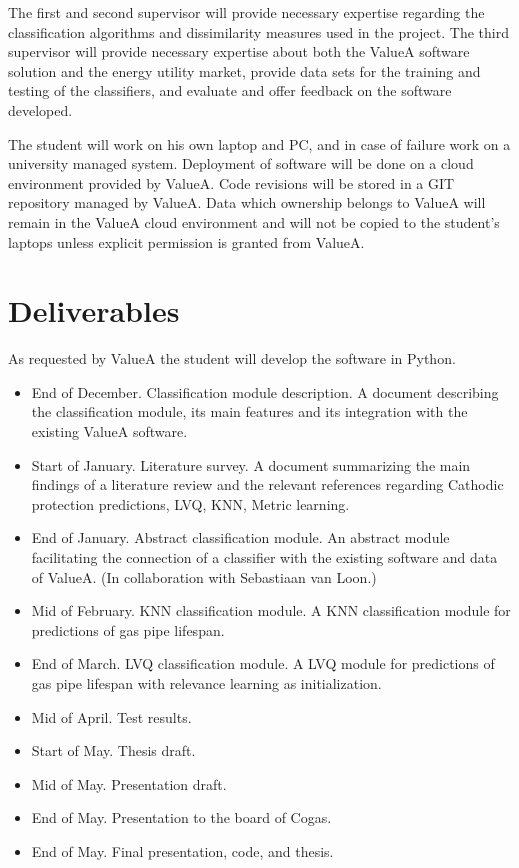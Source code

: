 The first and second supervisor will provide necessary expertise regarding the classification algorithms and dissimilarity measures used in the project. The third supervisor will provide necessary expertise about both the ValueA software solution and the energy utility market, provide data sets for the training and testing of the classifiers, and evaluate and offer feedback on the software developed.

The student will work on his own laptop and PC, and in case of failure work on a university managed system.  Deployment of software will be done on a cloud environment provided by ValueA. Code revisions will be stored in a GIT repository managed by ValueA. Data which ownership belongs to ValueA will remain in the ValueA cloud environment and will not be copied to the student’s laptops unless explicit permission is granted from ValueA.

\section{Deliverables}

As requested by ValueA the student will develop the software in Python.
\begin{itemize}
\item End of December. Classification module description. A document describing the classification module, its main features and its integration with the existing ValueA software.
\item Start of January. Literature survey. A document summarizing the main findings of a literature review and the relevant references regarding Cathodic protection predictions, LVQ, KNN, Metric learning.
\item End of January. Abstract classification module. An abstract module facilitating the connection of a classifier with the existing software and data of ValueA. (In collaboration with Sebastiaan van Loon.)
\item Mid of February. KNN classification module. A KNN classification module for predictions of gas pipe lifespan.
\item End of March. LVQ classification module. A LVQ module for predictions of gas pipe lifespan with relevance learning as initialization.
\item Mid of April. Test results.
\item Start of May. Thesis draft.
\item Mid of May. Presentation draft.
\item End of May. Presentation to the board of Cogas.
\item End of May. Final presentation, code, and thesis.
\end{itemize}

